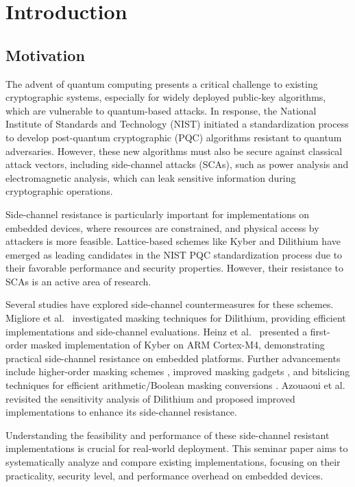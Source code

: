 \chapter{Introduction}

\section{Motivation}

The advent of quantum computing presents a critical challenge to existing cryptographic systems, especially for widely deployed public-key algorithms, which are vulnerable to quantum-based attacks. In response, the National Institute of Standards and Technology (NIST) initiated a standardization process to develop post-quantum cryptographic (PQC) algorithms resistant to quantum adversaries. However, these new algorithms must also be secure against classical attack vectors, including side-channel attacks (SCAs), such as power analysis and electromagnetic analysis, which can leak sensitive information during cryptographic operations.

Side-channel resistance is particularly important for implementations on embedded devices, where resources are constrained, and physical access by attackers is more feasible. Lattice-based schemes like Kyber and Dilithium have emerged as leading candidates in the NIST PQC standardization process due to their favorable performance and security properties. However, their resistance to SCAs is an active area of research.

Several studies have explored side-channel countermeasures for these schemes. Migliore et al.\ \cite{Migliore19} investigated masking techniques for Dilithium, providing efficient implementations and side-channel evaluations. Heinz et al.\ \cite{Heinz20} presented a first-order masked implementation of Kyber on ARM Cortex-M4, demonstrating practical side-channel resistance on embedded platforms. Further advancements include higher-order masking schemes \cite{Bos21}, improved masking gadgets \cite{Coron23}, and bitslicing techniques for efficient arithmetic/Boolean masking conversions \cite{Bronchain22}. Azouaoui et al.\ \cite{Azouaoui22} revisited the sensitivity analysis of Dilithium and proposed improved implementations to enhance its side-channel resistance.

Understanding the feasibility and performance of these side-channel resistant implementations is crucial for real-world deployment. This seminar paper aims to systematically analyze and compare existing implementations, focusing on their practicality, security level, and performance overhead on embedded devices.

